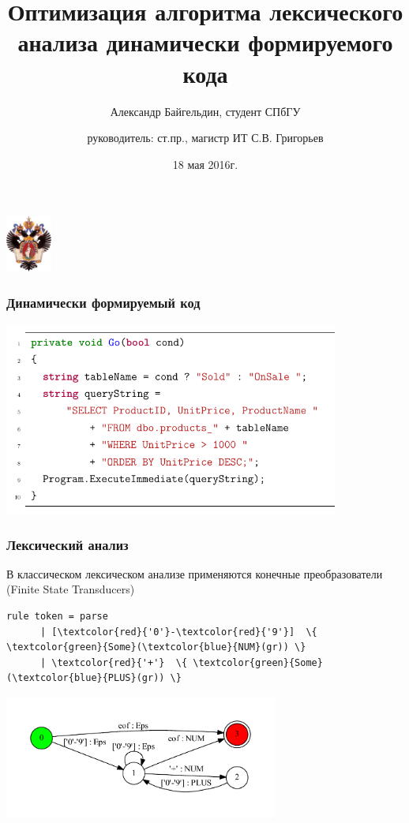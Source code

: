 \documentclass{beamer}
\title[]{Оптимизация алгоритма лексического анализа 
динамически формируемого кода}
\institute[СПбГУ]{
Санкт-Петербургский государственный университет \\
Кафедра системного программирования }
\author[Александр Байгельдин]{Александр Байгельдин, студент СПбГУ\\
  \and  
    {\bfseriesНаучный руководитель:} ст.пр., магистр ИТ С.В. Григорьев}
\date{18 мая 2016г.}
\begin{document}
{
\begin{frame}
  \begin{center}
  {\includegraphics[width=1.5cm]{pictures/SPbGU_Logo.png}}
  \end{center}
  \titlepage
\end{frame}
}

\begin{frame}[fragile]
  \transwipe[direction=90]
  \frametitle{Динамически формируемый код}
  \includegraphics[width=11cm]{pictures/intro_code.pdf}
\end{frame}
            
\begin{frame}[fragile]
  \transwipe[direction=90]
  \frametitle{Лексический анализ}
  В классическом лексическом анализе применяются конечные преобразователи 
  (Finite State Transducers) \\[1\baselineskip]
  \footnotesize
  \begin{Verbatim}[commandchars=\\\{\}]
      rule token = parse
      | [\textcolor{red}{'0'}-\textcolor{red}{'9'}]  \{ \textcolor{green}{Some}(\textcolor{blue}{NUM}(gr)) \}
      | \textcolor{red}{'+'}  \{ \textcolor{green}{Some}(\textcolor{blue}{PLUS}(gr)) \}
  \end{Verbatim}
  \normalsize
  \includegraphics[width=9cm]{pictures/lexer_.pdf}
\end{frame}
\end{document}
